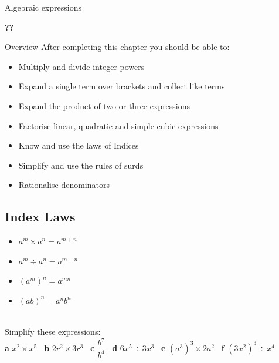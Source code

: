 \documentclass[fleqn]{article}
\newcommand\getcurrentref[1]{%
 \ifnumequal{\value{#1}}{0}
  {??}
  {\the\value{#1}}%
}
\newcommand\YUGE{\fontsize{35}{35}\selectfont}
\newcommand{\bookletunittitle}{Algebraic expressions}				%
\begin{document}
\newpage
\pagestyle{plain}
\setcounter{page}{1}
\begin{minipage}[t]{.85\textwidth}
		\sffamily{}
		\bfseries\YUGE\raggedright\bookletunittitle\\
\end{minipage}
\begin{minipage}[t]{.15\textwidth}
		\sffamily
		\bfseries\YUGE\raggedleft\getcurrentref{section}	
\end{minipage}

\begin{mybox2}[colbacktitle=green]{Overview}
	After completing this chapter you should be able to:
	\begin{itemize}
		\item Multiply and divide integer powers
		\item Expand a single term over brackets and collect like terms
		\item Expand the product of two or three expressions
		\item Factorise linear, quadratic and simple cubic expressions
		\item Know and use the laws of Indices
		\item Simplify and use the rules of surds
		\item Rationalise denominators	
	\end{itemize}
\end{mybox2}




\subsection{Index Laws}
\begin{itemize}
	\item $a^m \times a^n = a^{m+n}$
	\item $a^m \div a^n = a^{m-n}$
	\item $(a^m)^n = a^{mn}$
	\item $(ab)^n = a^nb^n$
\end{itemize}




\begin{examplebox}{}{}
	\\ %
	Simplify these expressions:\\
	\textbf{a}\hspace{2mm} $x^2 \times x^5$			\hspace{7mm} \
	\textbf{b}\hspace{2mm} $2r^2 \times 3r^3$ 		\hspace{7mm} \
	\textbf{c}\hspace{2mm} $\dfrac{b^7}{b^4}$ 		\hspace{7mm} \
	\textbf{d}\hspace{2mm} $6x^5 \div 3x^3$ 			\hspace{7mm} \
	\textbf{e}\hspace{2mm} $(a^3)^3 \times 2a^2$ 	\hspace{7mm} \
	\textbf{f}\hspace{2mm} $(3x^2)^3 \div x^4$
\end{examplebox}
\end{document}
